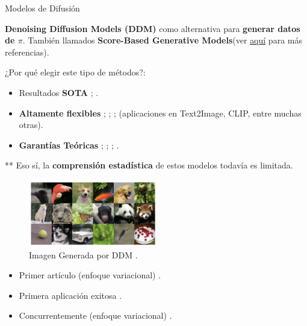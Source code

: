 \documentclass[aspectratio=169,xcolor=dvipsnames, t, spanish]{beamer}
\begin{document}
\begin{frame}{Modelos de Difusión}\vspace{-6mm}
    \begin{center}
        \textbf{Denoising Diffusion Models (DDM)} como alternativa para \textbf{generar datos de $\pi$}. También llamados \textbf{Score-Based Generative Models}(ver \href{https://scorebasedgenerativemodeling.github.io/}{aquí} para más referencias).
    \end{center}
        \pause
        
        ¿Por qué elegir este tipo de métodos?:
        \footnotesize
            \begin{itemize}
                \item Resultados \textbf{SOTA} \citet{DhariwalNichol2021}; \citet{Karras2022}.
                \item \textbf{Altamente flexibles} \citet{Poole2022}; \citet{Rombach2022}; \citet{Balaji2022}; \citet{Saharia2022} (aplicaciones en Text2Image, CLIP, entre muchas otras).
                \item \textbf{Garantías Teóricas} \citet{DeBortoli2021b}; \citet{Chen2022}; \citet{Pidstrigach2022}; \citet{Lee2022}.
            \end{itemize}
        ** Eso sí, la \textbf{comprensión estadística} de estos modelos todavía es limitada.
        \pause
    
        \begin{minipage}{0.6\textwidth}
        \begin{figure}
            \includegraphics[width=0.5\textwidth]{figures/ImgDiffusion.png}
            \caption{Imagen Generada por DDM \cite{DhariwalNichol2021}.}
        \end{figure}    
        \end{minipage}\begin{minipage}{0.4\textwidth}
        \begin{itemize}
                \item Primer artículo (enfoque variacional) \citet{Sohl-Dickstein2015}.
                \item Primera aplicación exitosa \citet{SongErmon2019}.
                \item Concurrentemente (enfoque variacional) \citet{Ho2020}.
            \end{itemize}
        \end{minipage}
        
    \end{frame}
    
\end{document}
